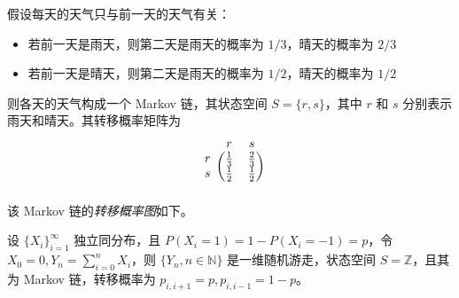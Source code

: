 \documentclass[../main.tex]{subfiles}
\begin{document}
\begin{example}
    假设每天的天气只与前一天的天气有关：
    \begin{itemize}
        \item 若前一天是雨天，则第二天是雨天的概率为 $1/3$，晴天的概率为 $2/3$
        \item 若前一天是晴天，则第二天是雨天的概率为 $1/2$，晴天的概率为 $1/2$
    \end{itemize}
    则各天的天气构成一个 Markov 链，其状态空间 $S=\{r,s\}$，其中 $r$ 和 $s$ 分别表示雨天和晴天。其转移概率矩阵为
    \[
        \begin{blockarray}{ccc}
            & r & s \\
            \begin{block}{c(cc)}
                r & \frac13 & \frac23 \\
                s & \frac12 & \frac12 \\
            \end{block}
        \end{blockarray}
    \]
    该 Markov 链的\emph{转移概率图}如下。
    \begin{center}
    \end{center}
\end{example}

\begin{example}
    设 $\{X_i\}_{i=1}^\infty$ 独立同分布，且 $P(X_i=1)=1-P(X_i=-1)=p$，令 $X_0=0,Y_n=\sum_{i=0}^nX_i$，则 $\{Y_n,n\in\mathbb N\}$ 是一维随机游走，状态空间 $S=\mathbb Z$，且其为 Markov 链，转移概率为 $p_{i,i+1}=p,p_{i,i-1}=1-p$。
\end{example}
\end{document}
